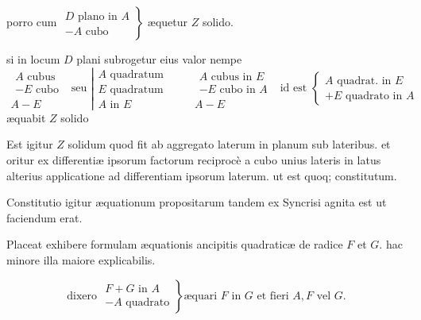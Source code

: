 \documentclass[11pt,a4paper]{article}
\begin{document}
porro cum $\left.\begin{array}{l} D \text{ plano in } A \\ - A \text{ cubo} \end{array}\right\}$ æquetur $Z$ solido.

si in locum $D$ plani subrogetur eius valor nempe
\[ \begin{array}{c} \begin{array}{l} A \text{ cubus} \\ - E \text{ cubo} \end{array} \\ \hline A - E \end{array} \text{ seu } \left|\begin{array}{l} A \text{ quadratum} \\ E \text{ quadratum} \\ A \text{ in } E \end{array}\right. \qquad \begin{array}{c} \begin{array}{l} A \text{ cubus in } E \\ - E \text{ cubo in } A \end{array} \\ \hline A - E \end{array} \text{ id est } \left\{\begin{array}{l} A \text{ quadrat. in } E \\ + E \text{ quadrato in } A \end{array}\right. \]
æquabit $Z$ solido

Est igitur $Z$ solidum quod fit ab aggregato laterum in planum sub lateribus. et oritur ex differentiæ ipsorum factorum reciprocè a cubo unius lateris in latus alterius applicatione ad differentiam ipsorum laterum. ut est quoq; constitutum.

Constitutio igitur æquationum propositarum tandem ex Syncrisi agnita est ut faciendum erat.

Placeat exhibere formulam æquationis ancipitis quadraticæ de radice $F$ et $G$. hac minore illa maiore explicabilis.

\[ \text{dixero } \left.\begin{array}{l} F + G \text{ in } A \\ - A \text{ quadrato} \end{array}\right\} \text{æquari } F \text{ in } G \text{ et fieri } A, F \text{ vel } G. \]
\end{document}
